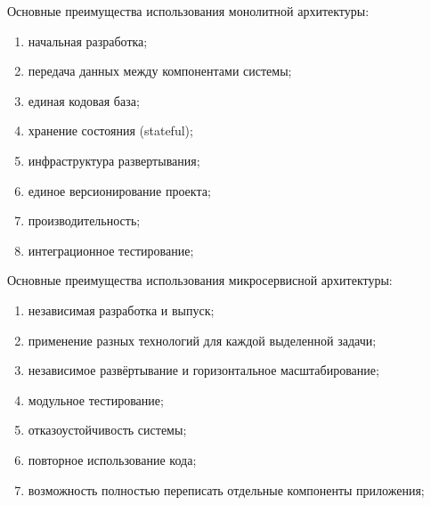 Основные преимущества использования монолитной архитектуры:

\begin{enumerate}[label*=\arabic*)]
	\item начальная разработка;
	\item передача данных между компонентами системы;
	\item единая кодовая база; %
	\item хранение состояния (stateful);
	\item инфраструктура развертывания; %
	\item единое версионирование проекта;
	\item производительность; %
	\item интеграционное тестирование;
\end{enumerate}

Основные преимущества использования микросервисной архитектуры:

\begin{enumerate}[label*=\arabic*)]
	\item независимая разработка и выпуск; %
	\item применение разных технологий для каждой выделенной задачи;
	\item независимое развёртывание и горизонтальное масштабирование; %
	\item модульное тестирование; %
	\item отказоустойчивость системы; %
	\item повторное использование кода; %
	\item возможность полностью переписать отдельные компоненты приложения; %
\end{enumerate}

